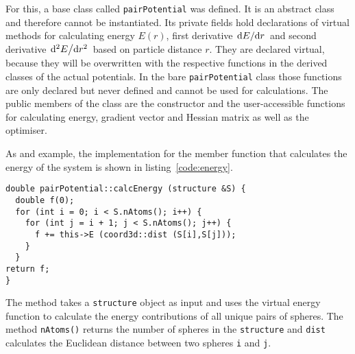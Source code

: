 For this, a base class called \verb|pairPotential| was defined. It is an
abstract class and therefore cannot be instantiated. Its private fields hold
declarations of virtual methods for calculating energy $E(r)$, first derivative
$\dv*{E}{r}$ and second derivative $\dv*[2]{E}{r}$ based on particle distance
$r$. They are declared virtual, because they will be overwritten with the
respective functions in the derived classes of the actual potentials. In the
bare \verb|pairPotential| class those functions are only declared but never
defined and cannot be used for calculations. The public members of the class are
the constructor and the user-accessible functions for calculating energy,
gradient vector and Hessian matrix as well as the optimiser.

As and example, the \Cpp implementation for the member function that calculates
the energy of the system is shown in listing~\ref{code:energy}.
%
\begin{lstlisting}[caption={Implementation of the redundant part of the energy calculation.},label=code:energy,float=htb]
double pairPotential::calcEnergy (structure &S) {
  double f(0);
  for (int i = 0; i < S.nAtoms(); i++) {
    for (int j = i + 1; j < S.nAtoms(); j++) {
      f += this->E (coord3d::dist (S[i],S[j]));
    }
  }
return f;
}
\end{lstlisting}
%
The method takes a \verb|structure| object as input and uses the virtual energy
function to calculate the energy contributions of all unique pairs of spheres.
The method \texttt{nAtoms()} returns the number of spheres in the
\texttt{structure} and \texttt{dist} calculates the Euclidean distance between
two spheres \texttt{i} and \texttt{j}.

